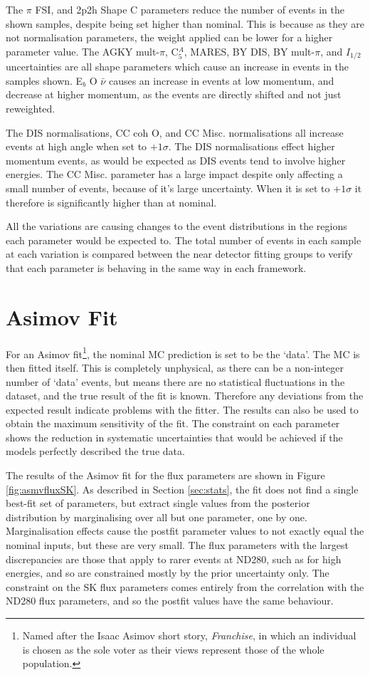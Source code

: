 The $\pi$ FSI, and 2p2h Shape C parameters reduce the number of events in the shown samples, despite being set higher than nominal. This is because as they are not normalisation parameters, the weight applied can be lower for a higher parameter value. The AGKY mult-$\pi$, C$^{A}_{5}$, MARES, BY DIS, BY mult-$\pi$, and $I_{1/2}$ uncertainties are all shape parameters which cause an increase in events in the samples shown. E$_{b}$ O $\bar{\nu}$ causes an increase in events at low momentum, and decrease at higher momentum, as the events are directly shifted and not just reweighted.

The DIS normalisations, CC coh O, and CC Misc. normalisations all increase events at high angle when set to $+1\sigma$. The DIS normalisations effect higher momentum events, as would be expected as DIS events tend to involve higher energies. The CC Misc. parameter has a large impact despite only affecting a small number of events, because of it's large uncertainty. When it is set to $+1\sigma$ it therefore is significantly higher than at nominal.

All the variations are causing changes to the event distributions in the regions each parameter would be expected to. The total number of events in each sample at each variation is compared between the near detector fitting groups to verify that each parameter is behaving in the same way in each framework.

\section{Asimov Fit}\label{sec:asimov}

For an Asimov fit\footnote{Named after the Isaac Asimov short story, \textit{Franchise}, in which an individual is chosen as the sole voter as their views represent those of the whole population.}, the nominal MC prediction is set to be the `data'. The MC is then fitted itself. This is completely unphysical, as there can be a non-integer number of `data' events, but means there are no statistical fluctuations in the dataset, and the true result of the fit is known. Therefore any deviations from the expected result indicate problems with the fitter. The results can also be used to obtain the maximum sensitivity of the fit. The constraint on each parameter shows the reduction in systematic uncertainties that would be achieved if the models perfectly described the true data.

The results of the Asimov fit for the flux parameters are shown in Figure \ref{fig:asmvfluxSK}. As described in Section \ref{sec:stats}, the fit does not find a single best-fit set of parameters, but extract single values from the posterior distribution by marginalising over all but one parameter, one by one. Marginalisation effects cause the postfit parameter values to not exactly equal the nominal inputs, but these are very small. The flux parameters with the largest discrepancies are those that apply to rarer events at ND280, such as for high energies, and so are constrained mostly by the prior uncertainty only. The constraint on the SK flux parameters comes entirely from the correlation with the ND280 flux parameters, and so the postfit values have the same behaviour.

